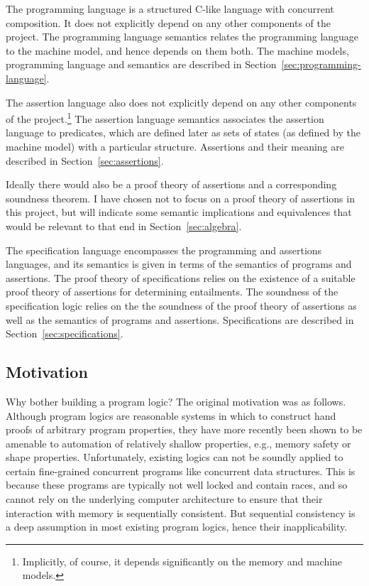 \documentclass[11pt]{article}
\begin{document}
The programming language is a structured C-like language with concurrent composition. It does not explicitly depend on any other components of the project. The programming language semantics relates the programming language to the machine model, and hence depends on them both. The machine models, programming language and semantics are described in Section~\ref{sec:programming-language}. 

The assertion language also does not explicitly depend on any other components of the project.\footnote{Implicitly, of course, it depends significantly on the memory and machine models.} The assertion language semantics associates the assertion language to predicates, which are defined later as sets of states (as defined by the machine model) with a particular structure. Assertions and their meaning are described in Section~\ref{sec:assertions}. 

Ideally there would also be a proof theory of assertions and a corresponding soundness theorem. I have chosen not to focus on a proof theory of assertions in this project, but will indicate some semantic implications and equivalences that would be relevant to that end in Section~\ref{sec:algebra}.

The specification language encompasses the programming and assertions languages, and its semantics is given in terms of the semantics of programs and assertions. The proof theory of specifications relies on the existence of a suitable proof theory of assertions for determining entailments. The soundness of the specification logic relies on the the soundness of the proof theory of assertions as well as the semantics of programs and assertions. Specifications are described in Section~\ref{sec:specifications}. 

\subsection{Motivation}

Why bother building a program logic? The original motivation was as follows. Although program logics are reasonable systems in which to construct hand proofs of arbitrary program properties, they have more recently been shown to be amenable to automation of relatively shallow properties, e.g., memory safety or shape properties. Unfortunately, existing logics can not be soundly applied to certain fine-grained concurrent programs like concurrent data structures. This is because these programs are typically not well locked and contain races, and so cannot rely on the underlying computer architecture to ensure that their interaction with memory is sequentially consistent. But sequential consistency is a deep assumption in most existing program logics, hence their inapplicability. 
\end{document}
